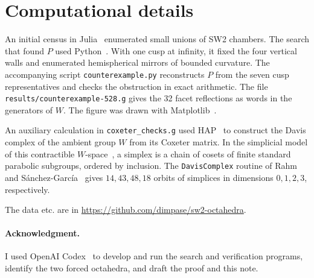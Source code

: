 \documentclass[11pt]{article}
\begin{document}
\newpage
\section*{Computational details}
An initial census in Julia~\cite{julia} enumerated small unions of SW2 chambers. The search that found \(P\) used Python~\cite{python}. With one cusp at infinity, it fixed the four vertical walls and enumerated hemispherical mirrors of bounded curvature. The accompanying script \texttt{counterexample.py} reconstructs \(P\) from the seven cusp representatives and checks the obstruction in exact arithmetic. The file \texttt{results/counterexample-528.g} gives the 32 facet reflections as words in the generators of \(W\). The figure was drawn with Matplotlib~\cite{matplotlib}.

An auxiliary calculation in \texttt{coxeter\_checks.g} used HAP~\cite{hap} to construct the Davis complex of the ambient group \(W\) from its Coxeter matrix. In the simplicial model of this contractible \(W\)-space~\cite{davis,davis-book}, a simplex is a chain of cosets of finite standard parabolic subgroups, ordered by inclusion. The \texttt{DavisComplex} routine of Rahm and S\'anchez-Garc\'ia~\cite{hap-davis,sg} gives \(14,43,48,18\) orbits of simplices in dimensions \(0,1,2,3\), respectively.

The data etc. are in \url{https://github.com/dimpase/sw2-octahedra}.

\paragraph{Acknowledgment.}
I used OpenAI Codex~\cite{codex} to develop and run the search and verification programs, identify the two forced octahedra, and draft the proof and this note.
\end{document}
